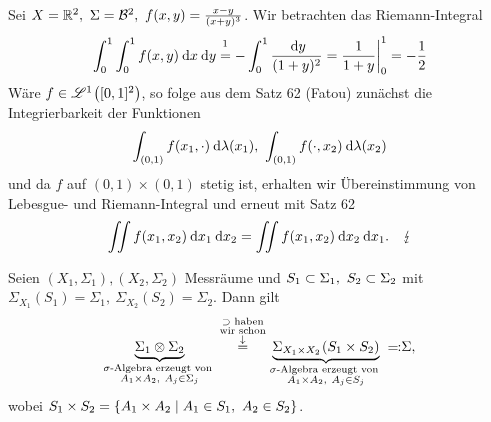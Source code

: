 \documentclass[skript.tex]{subfiles}
\begin{document}
	\setcounter{cntr}{62}
	\begin{bsp}
		Sei $X=\mathbb{R}^2,\ \Sigma = \mathcal{B}^2,\ f(x,y)=\frac{x-y}{(x+y)^3}$. Wir betrachten das Riemann-Integral
		\[
			\int_0^1 \int_0^1 f(x,y) \md x \md y \stackrel{\footnotemark}{=} - \int_0^1 \frac{\md y}{(1+y)^2} = \frac{1}{1+y} \bigg\vert_0^1 = -\frac{1}{2}
		\] 
		Wäre $f\in \mathscr{L}^1\pr{[0,1]^2}$, so folge aus dem \textup{Satz 62 (Fatou)} zunächst die Integrierbarkeit der Funktionen
		\[
			\int_{(0,1)} f(x_1,\cdot) \: \mathrm{d} \lambda(x_1),\ \int_{(0,1)} f(\cdot, x_2) \: \mathrm{d} \lambda(x_2) 
		\]
		und da $f$ auf $(0,1)\times(0,1)$ stetig ist, erhalten wir Übereinstimmung von Lebesgue- und Riemann-Integral und erneut mit \textup{Satz 62}
		\[
			\iint f(x_1, x_2) \md x_1 \md x_2 = \iint f(x_1, x_2) \md x_2 \md x_1. \quad \lightning %
		\]
	\end{bsp}
	
	\begin{lem}
		Seien $(X_1, \Sigma_1),(X_2, \Sigma_2)$ Messräume und $S_1 \subset \Sigma_1,\ S_2 \subset \Sigma_2$ mit\\ $\Sigma_{X_1}(S_1) = \Sigma_1,\ \Sigma_{X_2}(S_2) = \Sigma_2$. Dann gilt
		\[
			\underbrace{\Sigma_1 \otimes \Sigma_2}_{\substack{\sigma\text{-Algebra erzeugt von }\\ A_1\times A_2,\ A_j \in \Sigma_j}} \stackrel{\substack{\supset \text{ haben} \\ \text{wir schon} \\ \downarrow}}{=} \underbrace{\Sigma_{X_1 \times X_2}\pr{S_1 \times S_2}}_{\substack{\sigma\text{-Algebra erzeugt von }\\ A_1\times A_2,\ A_j \in S_j}}\: \mathrm{\rotatebox[origin=c]{180}{$\ceq$}} \Sigma,
		\]
		wobei $S_1 \times S_2 = \left\{A_1 \times A_2 \mid A_1 \in S_1,\ A_2 \in S_2\right\}$.
	\end{lem}
	
\end{document}
